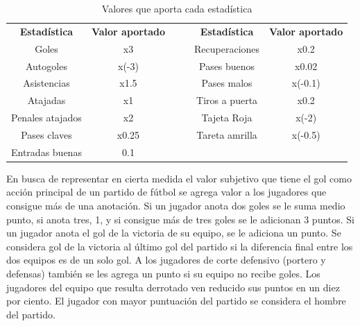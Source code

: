 \begin{table}[]
    \begin{center}
        

    \begin{tabular}{|c|c|llcc}
    \cline{1-2} \cline{5-6}
    \textbf{Estadística} &
      \textbf{Valor aportado} &
      \multicolumn{2}{l|}{\multirow{4}{*}{}} &
      \multicolumn{1}{c|}{\textbf{Estadística}} &
      \multicolumn{1}{c|}{\textbf{Valor aportado}} \\ \cline{1-2} \cline{5-6} 
    Goles            & x3    & \multicolumn{2}{l|}{}    & \multicolumn{1}{c|}{Recuperaciones} & \multicolumn{1}{c|}{x0.2}    \\ \cline{1-2} \cline{5-6} 
    Autogoles        & x(-3) & \multicolumn{2}{l|}{}    & \multicolumn{1}{c|}{Pases buenos}   & \multicolumn{1}{c|}{x0.02}   \\ \cline{1-2} \cline{5-6} 
    Asistencias      & x1.5  & \multicolumn{2}{l|}{}    & \multicolumn{1}{c|}{Pases malos}    & \multicolumn{1}{c|}{x(-0.1)} \\ \cline{1-2} \cline{5-6} 
    Atajadas         & x1    &  & \multicolumn{1}{l|}{} & \multicolumn{1}{c|}{Tiros a puerta} & \multicolumn{1}{c|}{x0.2}    \\ \cline{1-2} \cline{5-6} 
    Penales atajados & x2    &  & \multicolumn{1}{l|}{} & \multicolumn{1}{c|}{Tajeta Roja}    & \multicolumn{1}{c|}{x(-2)}   \\ \cline{1-2} \cline{5-6} 
    Pases claves     & x0.25 &  & \multicolumn{1}{l|}{} & \multicolumn{1}{c|}{Tareta amrilla} & \multicolumn{1}{c|}{x(-0.5)} \\ \cline{1-2} \cline{5-6} 
    Entradas buenas  & 0.1   &  &                       &                                     &                              \\ \cline{1-2}
    \end{tabular}
    \end{center}
    \caption{Valores que aporta cada estadística}
    \label{tab:tablaheuristica}
    \end{table}

    En busca de representar en cierta medida el valor subjetivo que tiene el gol como acción principal de un partido de fútbol se agrega valor a los jugadores que 
consigue más de una anotación. Si un jugador anota dos goles se le suma medio punto, si anota tres, 1, y si consigue más de tres goles se le adicionan 3 puntos. 
Si un jugador anota el gol de la victoria de su equipo, se le 
adiciona un punto.  Se considera gol de la victoria al último gol del partido si la diferencia final entre los dos equipos es de un solo gol. A los 
jugadores de corte defensivo (portero y defensas) también se les agrega un punto si su equipo no recibe goles. Los jugadores del equipo que resulta derrotado ven 
reducido sus puntos en un diez por ciento. El jugador con mayor puntuación del partido se considera el hombre del partido.



